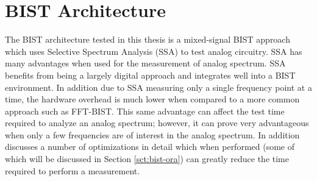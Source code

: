 \documentclass[12pt]{report}
\begin{document}
\section{BIST Architecture}
The BIST architecture tested in this thesis is a mixed-signal BIST approach which uses Selective Spectrum Analysis (SSA) to test analog circuitry.  SSA has many advantages when used for the measurement of analog spectrum.  SSA benefits from being a largely digital approach and integrates well into a BIST environment\cite{jie-journal}.  In addition due to SSA measuring only a single frequency point at a time, the hardware overhead is much lower when compared to a more common approach such as FFT-BIST\cite{stroud-phase}.  This same advantage can affect the test time required to analyze an analog spectrum; however, it can prove very advantageous when only a few frequencies are of interest in the analog spectrum\cite{jie-journal}.  In addition \cite{jie} discusses a number of optimizations in detail which when performed (some of which will be discussed in Section \ref{sct:bist-ora}) can greatly reduce the time required to perform a measurement.
\end{document}
